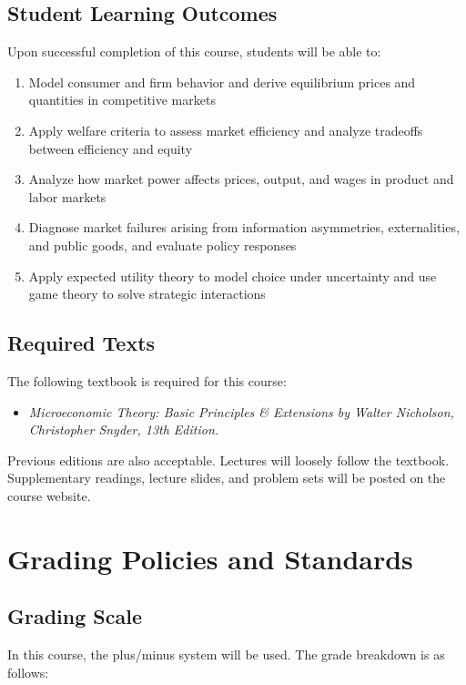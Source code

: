 \documentclass{syllabus}
\begin{document}
\subsection*{Student Learning Outcomes}
Upon successful completion of this course, students will be able to:
\begin{enumerate}
\itemsep0em 
\item Model consumer and firm behavior and derive equilibrium prices and quantities in competitive markets
\item Apply welfare criteria to assess market efficiency and analyze tradeoffs between efficiency and equity
\item Analyze how market power affects prices, output, and wages in product and labor markets
\item Diagnose market failures arising from information asymmetries, externalities, and public goods, and evaluate policy responses
\item Apply expected utility theory to model choice under uncertainty and use game theory to solve strategic interactions
\end{enumerate}

\subsection*{Required Texts}

The following textbook is required for this course:

\begin{itemize}
\item \textit{Microeconomic Theory: Basic Principles \& Extensions by Walter Nicholson, Christopher Snyder, 13th Edition.}
\end{itemize}
Previous editions are also acceptable. Lectures will loosely follow the textbook. Supplementary readings, lecture slides, and problem sets will be posted on the course website.

\section*{Grading Policies and Standards}

\subsection*{Grading Scale}
In this course, the plus/minus system will be used. The grade breakdown is as follows:
\end{document}

